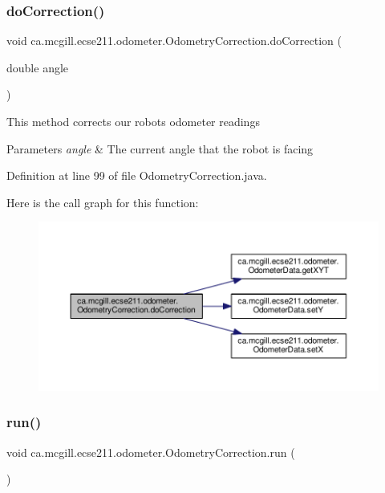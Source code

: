 \subsubsection{\texorpdfstring{do\+Correction()}{doCorrection()}}
{\footnotesize\ttfamily void ca.\+mcgill.\+ecse211.\+odometer.\+Odometry\+Correction.\+do\+Correction (\begin{DoxyParamCaption}\item[{double}]{angle }\end{DoxyParamCaption})}

This method corrects our robot\textquotesingle{}s odometer readings


\begin{DoxyParams}{Parameters}
{\em angle} & The current angle that the robot is facing \\
\hline
\end{DoxyParams}


Definition at line 99 of file Odometry\+Correction.\+java.

Here is the call graph for this function\+:
\nopagebreak
\begin{figure}[H]
\begin{center}
\leavevmode
\includegraphics[width=350pt]{classca_1_1mcgill_1_1ecse211_1_1odometer_1_1_odometry_correction_a21a351682dc75060d6a5f15ad4775068_cgraph}
\end{center}
\end{figure}
\mbox{\label{classca_1_1mcgill_1_1ecse211_1_1odometer_1_1_odometry_correction_aad66a7030ac00f3a9cbe7bc33c25acbf}} 
\subsubsection{\texorpdfstring{run()}{run()}}
{\footnotesize\ttfamily void ca.\+mcgill.\+ecse211.\+odometer.\+Odometry\+Correction.\+run (\begin{DoxyParamCaption}{ }\end{DoxyParamCaption})}


